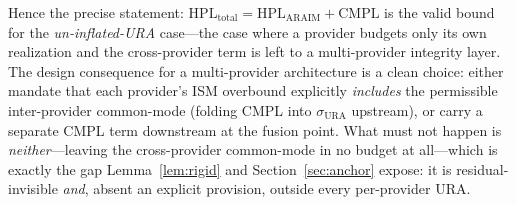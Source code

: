 Hence the precise statement:
$\mathrm{HPL}_{\mathrm{total}}=\mathrm{HPL}_{\mathrm{ARAIM}}+\mathrm{CMPL}$ is the valid
bound for the \emph{un-inflated-URA} case---the case where a provider budgets only its
own realization and the cross-provider term is left to a multi-provider integrity layer.
The design consequence for a multi-provider architecture is a clean choice: either
mandate that each provider's ISM overbound explicitly \emph{includes} the permissible
inter-provider common-mode (folding CMPL into $\sigma_{\mathrm{URA}}$ upstream), or
carry a separate CMPL term downstream at the fusion point. What must not happen is
\emph{neither}---leaving the cross-provider common-mode in no budget at all---which is
exactly the gap Lemma~\ref{lem:rigid} and Section~\ref{sec:anchor} expose: it is
residual-invisible \emph{and}, absent an explicit provision, outside every
per-provider URA.
